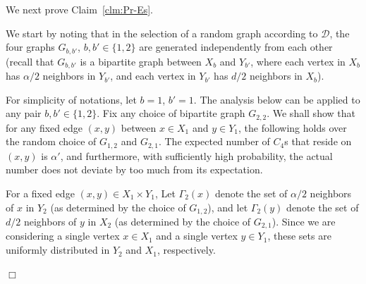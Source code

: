 \documentclass{article}
\newenvironment{proofof}[1]{\smallskip\noindent{\bf Proof of #1:}}%
        {\hspace*{\fill}$\Box$\par}
\begin{document}
\smallskip
\noindent
 We next prove Claim~\ref{clm:Pr-Es}.

 \smallskip
\begin{proofof}{Claim~\ref{clm:Pr-Es}}
We start by noting that in the selection of a random graph according to $\mathcal{D}$, the four graphs $G_{b,b'}$, $b,b' \in \{1,2\}$ are generated independently from each other (recall that $G_{b,b'}$ is a bipartite graph between $X_b$ and $Y_{b'}$, where each vertex in $X_b$ has $\alpha/2$ neighbors in $Y_{b'}$, and each vertex in $Y_{b'}$ has $d/2$ neighbors in $X_b$).

\medskip
For simplicity of notations, let $b=1$, $b'=1$.
The analysis below can be applied to any pair $b,b' \in \{1,2\}$.
Fix any choice of bipartite graph $G_{2,2}$.
We shall show that for any fixed edge $(x,y)$ between $x\in X_1$ and $y \in Y_1$, the following holds over the random choice of $G_{1,2}$ and $G_{2,1}$.
The expected number of $C_4$s that reside on $(x,y)$ is $\alpha'$, and furthermore, with sufficiently high probability, the actual number does not deviate by too much from its expectation.

For a fixed edge $(x,y)\in X_1\times Y_1$,
Let $\Gamma_2(x)$ denote  the set of $\alpha/2$ neighbors of $x$ in $Y_2$ (as determined by the choice of $G_{1,2}$), and let $\Gamma_2(y)$ denote the set of $d/2$ neighbors of $y$ in $X_2$ (as determined by the choice of $G_{2,1}$). Since we are considering a single vertex $x\in X_1$ and a single vertex $y\in Y_1$, these sets are uniformly distributed in $Y_2$ and $X_1$, respectively.


\end{proofof}
\end{document}
